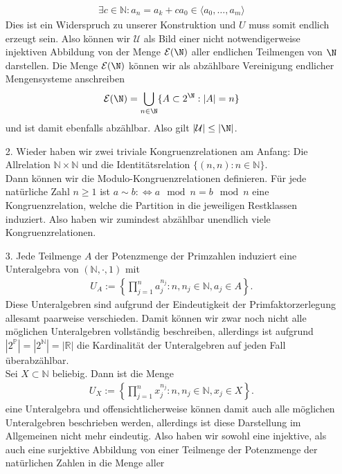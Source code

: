 \begin{solution}
\begin{itemize}
\begin{align*}
  \exists c \in \mathbb{N}: a_n = a_k + ca_0 \in \langle a_0,\dots,a_m \rangle
\end{align*}
Dies ist ein Widerspruch zu unserer Konstruktion und $U$ muss somit endlich erzeugt sein.
Also können wir $\mathcal{U}$ als Bild einer nicht notwendigerweise injektiven
Abbildung von der Menge $\mathcal{E}(\N)$ aller endlichen Teilmengen von $\N$ darstellen.
Die Menge $\mathcal{E}(\N)$ können wir als
abzählbare Vereinigung endlicher Mengensysteme anschreiben
\begin{align*}
  \mathcal{E}(\N) = \bigcup_{n \in \N} \{A \subset 2^\N: |A| = n \}
\end{align*}
und ist damit ebenfalls abzählbar. Also gilt $|\mathcal{U}| \leq |\N|$.
\item [2.] Wieder haben wir zwei triviale Kongruenzrelationen am Anfang:
Die Allrelation $\mathbb{N} \times \mathbb{N}$ und die Identitätsrelation
$\{(n,n): n \in \mathbb{N}\}$. \\
Dann können wir die Modulo-Kongruenzrelationen definieren. Für jede natürliche Zahl
$n \geq 1$ ist $a \sim b: \iff a \mod n = b \mod n$ eine Kongruenzrelation, welche
die Partition in die jeweiligen Restklassen induziert.
Also haben wir zumindest abzählbar unendlich viele Kongruenzrelationen.
\item [3.] Jede Teilmenge $A$ der Potenzmenge der Primzahlen induziert eine
Unteralgebra von $(\mathbb{N},\cdot,1)$ mit
\begin{align*}
  U_A := \left\{\prod_{j=1}^na_j^{n_j}: n, n_j \in \mathbb{N}, a_j \in A\right\}.
\end{align*}
Diese Unteralgebren sind aufgrund der Eindeutigkeit
der Primfaktorzerlegung allesamt paarweise verschieden.
Damit können wir zwar noch nicht alle möglichen Unteralgebren
vollständig beschreiben, allerdings ist aufgrund $|2^\mathbb{P}| = |2^\mathbb{N}|
= |\mathbb{R}|$ die Kardinalität der Unteralgebren auf jeden
Fall überabzählbar. \\
Sei $X \subset \mathbb{N}$ beliebig.
Dann ist die Menge
\begin{align*}
  U_X := \left\{\prod_{j=1}^nx_j^{n_j}: n, n_j \in \mathbb{N}, x_j \in X\right\}.
\end{align*}
eine Unteralgebra und offensichtlicherweise können damit auch alle möglichen
Unteralgebren beschrieben werden, allerdings ist diese Darstellung im Allgemeinen
nicht mehr eindeutig.
Also haben wir sowohl eine injektive, als auch eine surjektive Abbildung von
einer Teilmenge der Potenzmenge der natürlichen Zahlen in die Menge aller

\end{itemize}
\end{solution}
